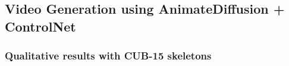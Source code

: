 \documentclass[final-report]{report-template}
\begin{document}







\subsection{Video Generation using AnimateDiffusion + ControlNet
}
\subsubsection{Qualitative results with CUB-15 skeletons}
\end{document}
